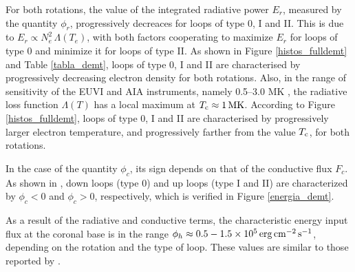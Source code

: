 \documentclass[namedreferences]{solarphysics}
\newcommand{\MK}{{\rm MK}}
\newcommand{\cm}{{\rm cm}}
\newcommand{\cminvs}{\cm^{-2}}
\newcommand{\erg}{{\rm erg}}
\newcommand{\s}{{\rm s}}
\newcommand{\Tc}{T_{\rm c}}
\begin{document}
\begin{article}
{For both rotations, the value of the integrated radiative power $E_r$, measured by the quantity $\phi_r$, progressively decreaces for loops of type 0, I and II. This is due to $E_r\propto N_e^2\,\Lambda(T_e)$, with both factors cooperating to maximize $E_r$ for loops of type 0 and minimize it for loops of type II. As shown in Figure \ref{histos_fulldemt} and Table \ref{tabla_demt}, loops of type 0, I and II are characterised by progressively decreasing electron density for both rotations. Also, in the range of sensitivity of the EUVI and AIA instruments, namely 0.5–3.0 MK \citep{nuevo_2015}, the radiative loss function $\Lambda(T)$ has a local maximum at $\Tc\approx 1\,\MK$. According to Figure \ref{histos_fulldemt}, loops of type 0, I and II are characterised by progressively larger electron temperature, and progressively farther from the value $\Tc$, for both rotations.}

{In the case of the quantity $\phi_c$, its sign depends on that of the conductive flux $F_c$. As shown in \citet{maccormack_2017}, down loops (type 0) and up loops (type I and II) are characterized by $\phi_c<0$ and $\phi_c>0$, respectively, which is verified in Figure \ref{energia_demt}.}

{As a result of the radiative and conductive terms, the characteristic energy input flux at the coronal base is in the range $\phi_h\approx 0.5-1.5 \times 10^5\,\erg\,\cminvs\,\s^{-1}$, depending on the rotation and the type of loop. These values are similar to those reported by \citet{maccormack_2017}.}





\end{article}
\end{document}
